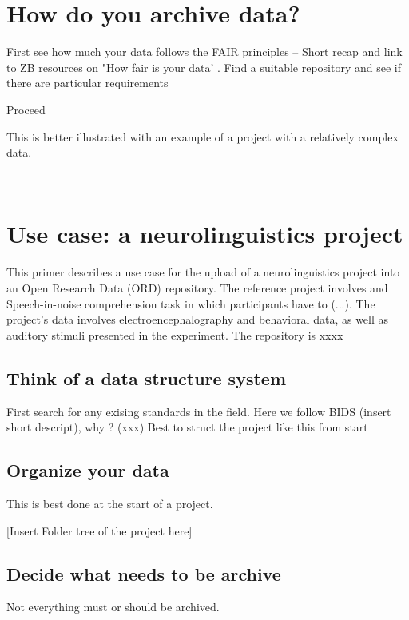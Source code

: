 \documentclass[a4paper,11pt]{report}
\begin{document}
\section*{How do you archive data?}
 First see how much your data follows the FAIR principles -- Short recap and link to ZB resources on "How fair is your data' . 
 Find a suitable repository and see if there are particular requirements
 
 Proceed

This is better illustrated with an example of a project with a relatively complex data. 

-------- 

\section*{Use case: a neurolinguistics project} 
This primer describes a use case for the upload of a neurolinguistics project into an Open Research Data (ORD) repository. The reference project involves and Speech-in-noise comprehension task in which participants have to (...). The project's data involves electroencephalography and behavioral data, as well as auditory stimuli presented in the experiment. The repository is xxxx 

\subsection*{Think of a data structure system}

First search for any exising standards in the field. Here we follow BIDS (insert short descript), why ? (xxx)
Best to struct the project like this from start

\subsection*{Organize your data}
This is best done at the start of a project.

[Insert Folder tree of the project here]


\subsection*{Decide what needs to be archive}
Not everything must or should be archived. 
\end{document}
